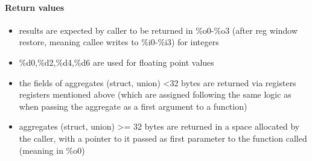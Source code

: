 \paragraph{Return values}

\begin{itemize}
\item results are expected by caller to be returned in \%o0-\%o3 (after reg window restore, meaning callee writes to \%i0-\%i3) for integers
\item \%d0,\%d2,\%d4,\%d6 are used for floating point values
\item the fields of aggregates (struct, union) \textless 32 bytes are returned via registers registers mentioned above (which are
assigned following the same logic as when passing the aggregate as a first argument to a function)
\item aggregates (struct, union) \textgreater= 32 bytes are returned in a space allocated by the caller, with a pointer to it
passed as first parameter to the function called (meaning in \%o0)
%
%
\end{itemize}

